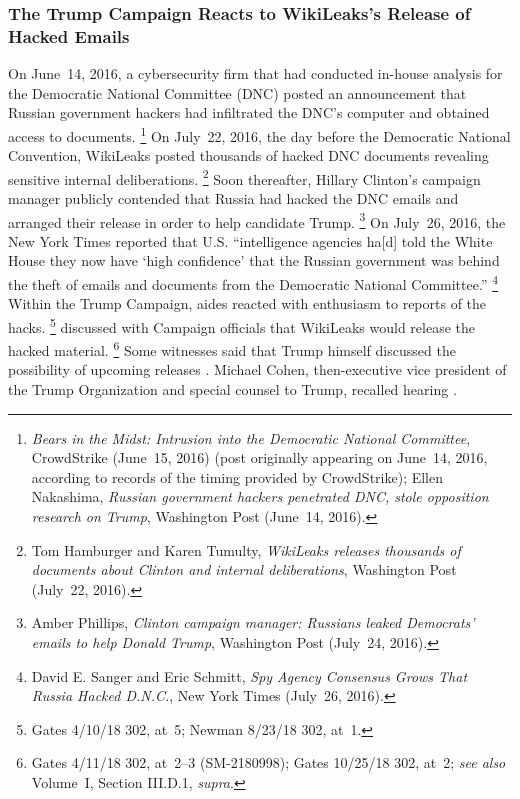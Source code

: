 \subsubsection{The Trump Campaign Reacts to WikiLeaks's Release of Hacked Emails}
On June~14, 2016, a cybersecurity firm that had conducted in-house analysis for the Democratic National Committee (DNC) posted an announcement that Russian government hackers had infiltrated the DNC's computer and obtained access to documents.%
\footnote{\textit{Bears in the Midst: Intrusion into the Democratic National Committee}, CrowdStrike (June~15, 2016) (post originally appearing on June~14, 2016, according to records of the timing provided by CrowdStrike);
Ellen Nakashima, \textit{Russian government hackers penetrated DNC, stole opposition research on Trump}, Washington Post (June~14, 2016).}
On July~22, 2016, the day before the Democratic National Convention, WikiLeaks posted thousands of hacked DNC documents revealing sensitive internal deliberations.%
\footnote{Tom Hamburger and Karen Tumulty, \textit{WikiLeaks releases thousands of documents about Clinton and internal deliberations}, Washington Post (July~22, 2016).}
Soon thereafter, Hillary Clinton's campaign manager publicly contended that Russia had hacked the DNC emails and arranged their release in order to help candidate Trump.%
\footnote{Amber Phillips, \textit{Clinton campaign manager: Russians leaked Democrats' emails to help Donald Trump}, Washington Post (July~24, 2016).}
On July~26, 2016, the New York Times reported that U.S. ``intelligence agencies ha[d] told the White House they now have `high confidence' that the Russian government was behind the theft of emails and documents from the Democratic National Committee.''%
\footnote{David E. Sanger and Eric Schmitt, \textit{Spy Agency Consensus Grows That Russia Hacked D.N.C.}, New York Times (July~26, 2016).}
Within the Trump Campaign, aides reacted with enthusiasm to reports of the hacks.%
\footnote{Gates 4/10/18 302, at~5;
Newman 8/23/18 302, at~1.}
 discussed with Campaign officials that WikiLeaks would release the hacked material.%
\footnote{Gates 4/11/18 302, at~2--3 (SM-2180998);
Gates 10/25/18 302, at~2;
\textit{see also} Volume~I, Section III.D.1, \textit{supra}.}
Some witnesses said that Trump himself discussed the possibility of upcoming releases .
Michael Cohen, then-executive vice president of the Trump Organization and special counsel to Trump, recalled hearing .%

